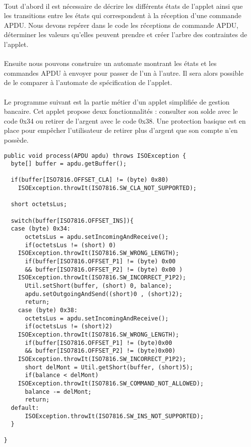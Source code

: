 \paragraph{}
Tout d’abord il est nécessaire de décrire les différents états de l’applet ainsi que les transitions entre les états qui correspondent à la réception d’une commande \gls{APDU}. Nous devons repérer dans le code les réceptions de commande \gls{APDU}, déterminer les valeurs qu’elles peuvent prendre et créer l’arbre des contraintes de l’applet.
\paragraph{}
Ensuite nous pouvons construire un automate montrant les états et les commandes \gls{APDU} à envoyer pour passer de l’un à l’autre. Il sera alors possible de le comparer à l’automate de spécification de l’applet.

\paragraph{}
Le programme suivant est la partie métier d’un applet simplifiée de gestion bancaire. Cet applet propose deux fonctionnalités : consulter son solde avec le code 0x34 ou retirer de l’argent avec le code 0x38. Une protection basique est en place pour empêcher l’utilisateur de retirer plus d’argent que son compte n’en possède.

\begin{verbatim}
public void process(APDU apdu) throws ISOException {
  byte[] buffer = apdu.getBuffer();
      
  if(buffer[ISO7816.OFFSET_CLA] != (byte) 0x80)
    ISOException.throwIt(ISO7816.SW_CLA_NOT_SUPPORTED);
      
  short octetsLus;
      
  switch(buffer[ISO7816.OFFSET_INS]){
  case (byte) 0x34:
      octetsLus = apdu.setIncomingAndReceive();
      if(octetsLus != (short) 0)
	ISOException.throwIt(ISO7816.SW_WRONG_LENGTH);
      if(buffer[ISO7816.OFFSET_P1] != (byte) 0x00 
	  && buffer[ISO7816.OFFSET_P2] != (byte) 0x00 )
	ISOException.throwIt(ISO7816.SW_INCORRECT_P1P2);
      Util.setShort(buffer, (short) 0, balance);
      apdu.setOutgoingAndSend((short)0 , (short)2);
      return;
    case (byte) 0x38:
      octetsLus = apdu.setIncomingAndReceive();
      if(octetsLus != (short)2)
	ISOException.throwIt(ISO7816.SW_WRONG_LENGTH);
      if(buffer[ISO7816.OFFSET_P1] != (byte)0x00 
	  && buffer[ISO7816.OFFSET_P2] != (byte)0x00)
	ISOException.throwIt(ISO7816.SW_INCORRECT_P1P2);
      short delMont = Util.getShort(buffer, (short)5);
      if(balance < delMont)
	ISOException.throwIt(ISO7816.SW_COMMAND_NOT_ALLOWED);
      balance -= delMont;
      return;
  default:
      ISOException.throwIt(ISO7816.SW_INS_NOT_SUPPORTED);
  }

}
\end{verbatim}

